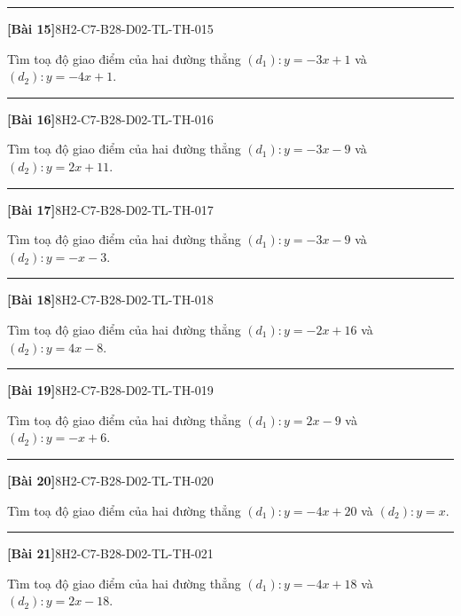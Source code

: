 \documentclass[12pt,a4paper]{article}
\newif\ifloigiai
\newenvironment{cauhoi}[2]{%
  \par\medskip\noindent\rule{\textwidth}{0.4pt}\par\nopagebreak
  \noindent\textbf{[#1]}\hfill{\scriptsize\ttfamily #2}\par\nopagebreak\smallskip}{\par}
\newcommand{\loigiai}[1]{\ifloigiai\par\smallskip\noindent\textit{Lời giải.} #1\par\fi}
\begin{document}
\begin{cauhoi}{Bài 15}{8H2-C7-B28-D02-TL-TH-015}
Tìm toạ độ giao điểm của hai đường thẳng $(d_1): y=-3x+1$ và $(d_2): y=-4x+1$.
\loigiai{Hoành độ giao điểm là nghiệm của phương trình $-3x+1=-4x+1$, suy ra $x=0$ nên $x=0$. Thay vào $(d_1)$: $y=-3\cdot(0)+1=1$. Vậy giao điểm là $(0;1)$.}
\end{cauhoi}
\begin{cauhoi}{Bài 16}{8H2-C7-B28-D02-TL-TH-016}
Tìm toạ độ giao điểm của hai đường thẳng $(d_1): y=-3x-9$ và $(d_2): y=2x+11$.
\loigiai{Hoành độ giao điểm là nghiệm của phương trình $-3x-9=2x+11$, suy ra $-5x=20$ nên $x=-4$. Thay vào $(d_1)$: $y=-3\cdot(-4)-9=3$. Vậy giao điểm là $(-4;3)$.}
\end{cauhoi}
\begin{cauhoi}{Bài 17}{8H2-C7-B28-D02-TL-TH-017}
Tìm toạ độ giao điểm của hai đường thẳng $(d_1): y=-3x-9$ và $(d_2): y=-x-3$.
\loigiai{Hoành độ giao điểm là nghiệm của phương trình $-3x-9=-x-3$, suy ra $-2x=6$ nên $x=-3$. Thay vào $(d_1)$: $y=-3\cdot(-3)-9=0$. Vậy giao điểm là $(-3;0)$.}
\end{cauhoi}
\begin{cauhoi}{Bài 18}{8H2-C7-B28-D02-TL-TH-018}
Tìm toạ độ giao điểm của hai đường thẳng $(d_1): y=-2x+16$ và $(d_2): y=4x-8$.
\loigiai{Hoành độ giao điểm là nghiệm của phương trình $-2x+16=4x-8$, suy ra $-6x=-24$ nên $x=4$. Thay vào $(d_1)$: $y=-2\cdot(4)+16=8$. Vậy giao điểm là $(4;8)$.}
\end{cauhoi}
\begin{cauhoi}{Bài 19}{8H2-C7-B28-D02-TL-TH-019}
Tìm toạ độ giao điểm của hai đường thẳng $(d_1): y=2x-9$ và $(d_2): y=-x+6$.
\loigiai{Hoành độ giao điểm là nghiệm của phương trình $2x-9=-x+6$, suy ra $3x=15$ nên $x=5$. Thay vào $(d_1)$: $y=2\cdot(5)-9=1$. Vậy giao điểm là $(5;1)$.}
\end{cauhoi}
\begin{cauhoi}{Bài 20}{8H2-C7-B28-D02-TL-TH-020}
Tìm toạ độ giao điểm của hai đường thẳng $(d_1): y=-4x+20$ và $(d_2): y=x$.
\loigiai{Hoành độ giao điểm là nghiệm của phương trình $-4x+20=x$, suy ra $-5x=-20$ nên $x=4$. Thay vào $(d_1)$: $y=-4\cdot(4)+20=4$. Vậy giao điểm là $(4;4)$.}
\end{cauhoi}
\begin{cauhoi}{Bài 21}{8H2-C7-B28-D02-TL-TH-021}
Tìm toạ độ giao điểm của hai đường thẳng $(d_1): y=-4x+18$ và $(d_2): y=2x-18$.
\loigiai{Hoành độ giao điểm là nghiệm của phương trình $-4x+18=2x-18$, suy ra $-6x=-36$ nên $x=6$. Thay vào $(d_1)$: $y=-4\cdot(6)+18=-6$. Vậy giao điểm là $(6;-6)$.}
\end{cauhoi}
\end{document}
